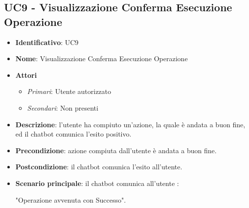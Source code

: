 \subsection{UC9 - Visualizzazione Conferma Esecuzione Operazione}
\begin{itemize}
	\item \textbf{Identificativo}: UC9
	\item \textbf{Nome}: Visualizzazione Conferma Esecuzione Operazione
	\item \textbf{Attori}
	\begin{itemize} 
		\item \textit{Primari}: Utente autorizzato
	    \item \textit{Secondari}: Non presenti
	\end{itemize}
	\item \textbf{Descrizione}: l'utente ha compiuto un'azione, la quale è andata a buon fine, ed il chatbot comunica l'esito positivo.
	\item \textbf{Precondizione}: azione compiuta dall'utente è andata a buon fine.
	\item \textbf{Postcondizione}: il chatbot comunica l'esito all'utente.
	\item \textbf{Scenario principale}: il chatbot comunica all'utente : \begin{center}
		"Operazione avvenuta con Successo".
	\end{center}
\end{itemize}


